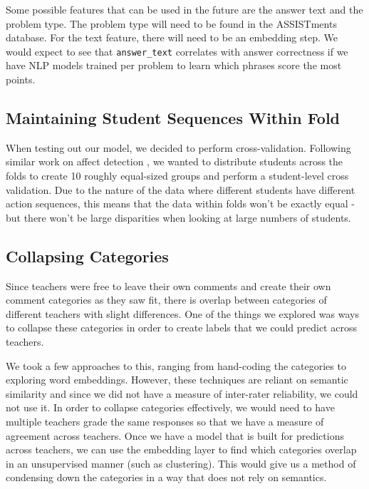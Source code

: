 \documentclass[12pt]{report}
\begin{document}
Some possible features that can be used in the future are the answer text and the problem type. The problem type will need to be found in the ASSISTments database. For the text feature, there will need to be an embedding step. We would expect to see that \texttt{answer\_text} correlates with answer correctness if we have NLP models trained per problem to learn which phrases score the most points.

\subsection{Maintaining Student Sequences Within Fold}
When testing out our model, we decided to perform cross-validation. Following similar work on affect detection \cite{affect_detection}\cite{Wang2015TowardsBA}, we wanted to distribute students across the folds to create 10 roughly equal-sized groups and perform a student-level cross validation. Due to the nature of the data where different students have different action sequences, this means that the data within folds won't be exactly equal - but there won't be large disparities when looking at large numbers of students.

\subsection{Collapsing Categories} 
Since teachers were free to leave their own comments and create their own comment categories as they saw fit, there is overlap between categories of different teachers with slight differences. One of the things we explored was ways to collapse these categories in order to create labels that we could predict across teachers.

We took a few approaches to this, ranging from hand-coding the categories to exploring word embeddings. However, these techniques are reliant on semantic similarity and since we did not have a measure of inter-rater reliability, we could not use it. In order to collapse categories effectively, we would need to have multiple teachers grade the same responses so that we have a measure of agreement across teachers. Once we have a model that is built for predictions across teachers, we can use the embedding layer to find which categories overlap in an unsupervised manner (such as clustering). This would give us a method of condensing down the categories in a way that does not rely on semantics.  %

\end{document}
